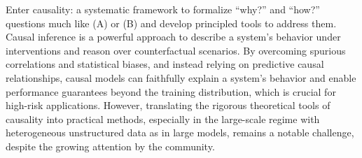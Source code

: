 \documentclass{article}
\newcommand{\todo}[1]{\textcolor{red}{~TODO: #1}}
\begin{document}
Enter causality: a systematic framework to formalize ``why?'' and ``how?'' questions much like (A) or (B) and develop principled tools to address them.
Causal inference is a powerful approach to describe a system's behavior under interventions and reason over counterfactual scenarios. 
By overcoming spurious correlations and statistical biases, and instead relying on predictive causal relationships, causal models can faithfully explain a system's behavior and enable performance guarantees beyond the training distribution, which is crucial for high-risk applications.
However, translating the rigorous theoretical tools of causality into practical methods, especially in the large-scale regime with heterogeneous unstructured data as in large models, remains a notable challenge, despite the growing attention by the community.


\end{document}

